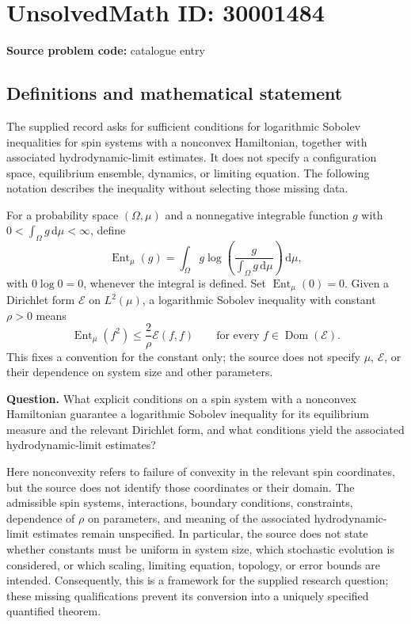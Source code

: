 \documentclass[11pt]{article}
\begin{document}
\section*{UnsolvedMath ID: 30001484}
\textbf{Source problem code:} catalogue entry
\subsection{Definitions and mathematical statement}
The supplied record asks for sufficient conditions for logarithmic Sobolev inequalities for spin systems with a nonconvex Hamiltonian, together with associated hydrodynamic-limit estimates. It does not specify a configuration space, equilibrium ensemble, dynamics, or limiting equation. The following notation describes the inequality without selecting those missing data.

For a probability space \((\Omega,\mu)\) and a nonnegative integrable function \(g\) with \(0<\int_\Omega g\,\mathrm d\mu<\infty\), define
\[
\operatorname{Ent}_{\mu}(g)
=\int_\Omega g\log\!\left(\frac{g}{\int_\Omega g\,\mathrm d\mu}\right)\,\mathrm d\mu,
\]
with \(0\log 0=0\), whenever the integral is defined. Set \(\operatorname{Ent}_{\mu}(0)=0\). Given a Dirichlet form \(\mathcal E\) on \(L^2(\mu)\), a logarithmic Sobolev inequality with constant \(\rho>0\) means
\[
\operatorname{Ent}_{\mu}(f^2)
\leq \frac{2}{\rho}\mathcal E(f,f)
\qquad\text{for every }f\in\operatorname{Dom}(\mathcal E).
\]
This fixes a convention for the constant only; the source does not specify \(\mu\), \(\mathcal E\), or their dependence on system size and other parameters.

\textbf{Question.} What explicit conditions on a spin system with a nonconvex Hamiltonian guarantee a logarithmic Sobolev inequality for its equilibrium measure and the relevant Dirichlet form, and what conditions yield the associated hydrodynamic-limit estimates?

Here nonconvexity refers to failure of convexity in the relevant spin coordinates, but the source does not identify those coordinates or their domain. The admissible spin systems, interactions, boundary conditions, constraints, dependence of \(\rho\) on parameters, and meaning of the associated hydrodynamic-limit estimates remain unspecified. In particular, the source does not state whether constants must be uniform in system size, which stochastic evolution is considered, or which scaling, limiting equation, topology, or error bounds are intended. Consequently, this is a framework for the supplied research question; these missing qualifications prevent its conversion into a uniquely specified quantified theorem.
\end{document}
